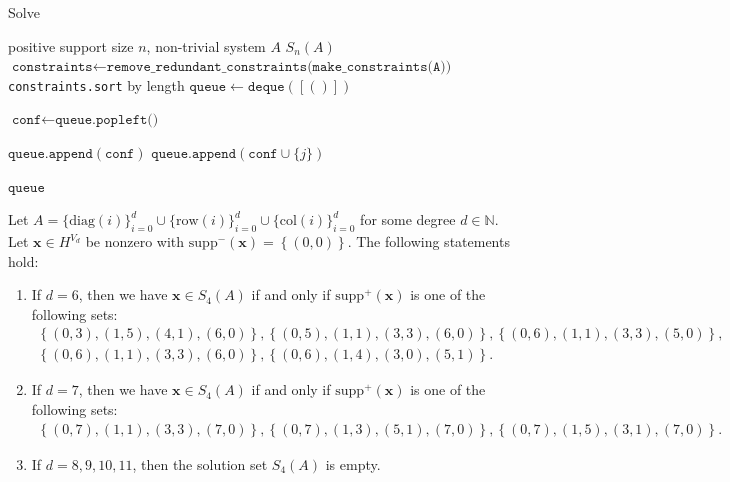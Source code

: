 \begin{algorithm}
\caption{Solve}
\label{alg:solve}
\begin{algorithmic}[1]
\Require positive support size \( n \), non-trivial system \( A \)
\Ensure \( S_n(A) \)
\State $\texttt{constraints} \gets \texttt{remove\_redundant\_constraints(make\_constraints(A))}$
\State \texttt{constraints.sort} by length
\State $\texttt{queue} \gets \texttt{deque}([()])$

        \State $\texttt{conf} \gets \texttt{queue.popleft()}$

            \State $\texttt{queue.append}(\texttt{conf})$
                \State $\texttt{queue.append}(\texttt{conf} \cup \{j\})$
            \EndFor
        \EndIf
    \EndFor
\EndFor

\State \Return $ \texttt{queue}$
\end{algorithmic}
\end{algorithm}
    

\begin{proposition}\label{prop:jdngkjrenj3nw}
    Let $A = \{ \mathrm{diag}(i) \}_{i=0}^d \cup \{ \mathrm{row}(i)\}^d_{i=0} \cup \{ \mathrm{col}(i) \}^d_{i=0}$ for some degree \( d \in \mathbb{N} \). Let \( \mathbf{x} \in H^{V_d} \) be nonzero with \( \mathrm{supp}^-(\mathbf{x}) = \left\{ (0,0) \right\} \). The following statements hold:

    \begin{enumerate}
        \item If \( d = 6 \), then we have \( \mathbf{x} \in S_4(A) \) if and only if \( \mathrm{supp}^+(\mathbf{x}) \) is one of the following sets:
        \begin{gather*}
            \left\{ (0,3), (1,5), (4,1), (6,0) \right\},
            \left\{ (0,5), (1,1), (3,3), (6,0) \right\},
            \left\{ (0,6), (1,1), (3,3), (5,0) \right\},\\
            \left\{ (0,6), (1,1), (3,3), (6,0) \right\},
            \left\{ (0,6), (1,4), (3,0), (5,1) \right\}.
        \end{gather*}
        \item If \( d = 7 \), then we have \( \mathbf{x} \in S_4(A) \) if and only if \( \mathrm{supp}^+(\mathbf{x}) \) is one of the following sets:
        \begin{gather*}
            \left\{ (0,7), (1,1), (3,3), (7,0) \right\},
            \left\{ (0,7), (1,3), (5,1), (7,0) \right\},
            \left\{ (0,7), (1,5), (3,1), (7,0) \right\}.
        \end{gather*}
        \item If \( d = 8, 9 ,10, 11 \), then the solution set \( S_4(A) \) is empty.
    \end{enumerate}
\end{proposition}

